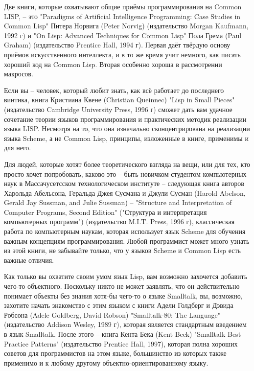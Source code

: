 Две книги, которые охватывают общие приёмы программирования на Common LISP, -- это
"Paradigms of Artificial Intelligence Programming: Case Studies in Common Lisp" Питера
Норвига (Peter Norvig) (издательство Morgan Kaufmann, 1992 г) и "On Lisp: Advanced
Techniques for Common Lisp" Пола Грема (Paul Graham) (издательство Prentice Hall, 1994
г). Первая даёт твёрдую основу приёмов искусственного интеллекта, и в то же время учит
немного, как писать хороший код на Common Lisp. Вторая особенно хороша в рассмотрении
макросов.

Если вы -- человек, который любит знать, как всё работает до последнего винтика, книга
Кристиана Квене (Christian Queinnec) "Lisp in Small Pieces" (издательство Cambridge
University Press, 1996 г) сможет дать вам удачное сочетание теории языков программирования
и практических методик реализации языка LISP. Несмотря на то, что она изначально
сконцентрирована на реализации языка Scheme, а не Common Lisp, принципы, изложенные в
книге, применимы и для него.

Для людей, которые хотят более теоретического взгляда на вещи, или для тех, кто просто
хочет попробовать, каково это -- быть новичком-студентом компьютерных наук в
Массачусетсском технологическом институте -- следующая книга авторов Харольда Абельсона,
Геральда Джея Сусмана и Джули Сусман (Harold Abelson, Gerald Jay Sussman, and Julie
Sussman) -- "Structure and Interpretation of Computer Programs, Second Edition"
("Структура и интерпретация компьютерных программ") (издательство M.I.T. Press, 1996 г),
классическая работа по компьютерным наукам, которая использует язык Scheme для обучения
важным концепциям программирования. Любой программист может много узнать из этой книги, не
забывайте только, что у языков Scheme и Common Lisp есть важные отличия.

Как только вы охватите своим умом язык Lisp, вам возможно захочется добавить чего-то
объектного. Поскольку никто не может заявлять, что он действительно понимает объекты без
знания хотя-бы чего-то о языке Smalltalk, вы, возможно, захотите начать знакомство с этим
языком с книги Адели Голдберг и Дэвида Робсона (Adele Goldberg, David Robson)
"Smalltalk-80: The Language" (издательство Addison Wesley, 1989 г), которая является
стандартным введением в язык Smalltalk. После этого -- книга Кента Бека (Kent Beck)
"Smalltalk Best Practice Patterns" (издательство Prentice Hall, 1997), которая полна
хороших советов для программистов на этом языке, большинство из которых также применимо и
к любому другому объектно-ориентированному языку.

